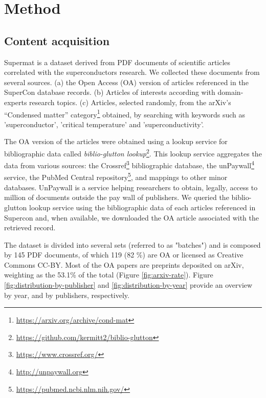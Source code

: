 \documentclass[a4paper,10pt]{article}
\begin{document}

\label{sec:method}
\section{Method}
\subsection{Content acquisition}
Supermat is a dataset derived from PDF documents of scientific articles correlated with the superconductors research. 
We collected these documents from several sources. (a) the Open Access (OA) version of articles referenced in the SuperCon database records. (b) Articles of interests according with domain-experts research topics. (c) Articles, selected randomly, from the arXiv's “Condensed matter” category\footnote{\url{https://arxiv.org/archive/cond-mat}} obtained, by searching with keywords such as 'superconductor', 'critical temperature' and 'superconductivity'.

The OA version of the articles were obtained using a lookup service for bibliographic data called \textit{biblio-glutton lookup}\footnote{\url{https://github.com/kermitt2/biblio-glutton}}. This lookup service aggregates the data from various sources: the Crossref\footnote{\url{https://www.crossref.org/}} bibliographic database, the unPaywall\footnote{\url{http://unpaywall.org}} service, the PubMed Central repository\footnote{\url{https://pubmed.ncbi.nlm.nih.gov/}}, and mappings to other minor databases. 
UnPaywall is a service helping researchers to obtain, legally, access to million of documents outside the pay wall of publishers. 
We queried the biblio-glutton lookup service using the bibliographic data of each articles referenced in Supercon and, when available, we downloaded the OA article associated with the retrieved record. 

The dataset is divided into several sets (referred to as "batches") and is composed by 145 PDF documents, of which 119 (82 \%) are OA or licensed as Creative Commons CC-BY. 
Most of the OA papers are preprints deposited on arXiv, weighting as the 53.1\% of the total (Figure \ref{fig:arxiv-rate}). 
Figure \ref{fig:distribution-by-publisher} and \ref{fig:distribution-by-year} provide an overview by year, and by publishers, respectively. 
\end{document}
